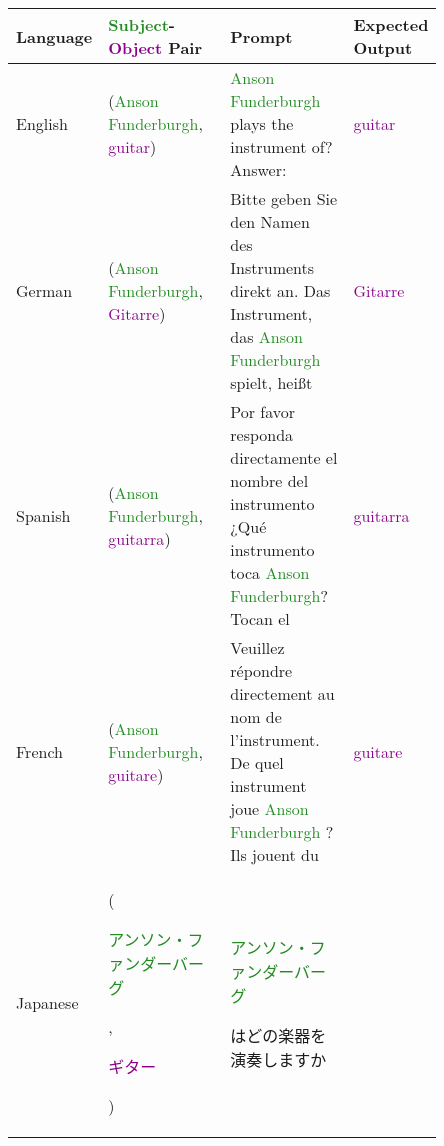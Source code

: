 \begin{table*}[htbp]
\scriptsize
\centering
\setlength{\tabcolsep}{1.0mm}{}
\begin{center}
\begin{tabular}{m{0.10\linewidth} p{0.30\linewidth} p{0.30\linewidth} m{0.15\linewidth}}
\textbf{Language} & \textbf{\textcolor{forestgreen}{Subject}-\textcolor{darkmagenta}{Object} Pair} & \textbf{Prompt} & \textbf{Expected Output} \\
\toprule
{\centering English} 
    & {\raggedright (\textcolor{forestgreen}{Anson Funderburgh}, \textcolor{darkmagenta}{guitar})}
    & \textcolor{forestgreen}{Anson Funderburgh} plays the instrument of? \newline Answer:
    & {\centering \textcolor{darkmagenta}{guitar}} \\
\midrule
{\centering German} 
    & {\raggedright (\textcolor{forestgreen}{Anson Funderburgh}, \textcolor{darkmagenta}{Gitarre})}
    & Bitte geben Sie den Namen des Instruments direkt an. Das Instrument, das \textcolor{forestgreen}{Anson Funderburgh} spielt, heißt
    & {\centering \textcolor{darkmagenta}{Gitarre}} \\
\midrule
{\centering Spanish} 
    & {\raggedright (\textcolor{forestgreen}{Anson Funderburgh}, \textcolor{darkmagenta}{guitarra})}
    & Por favor responda directamente el nombre del instrumento ¿Qué instrumento toca \textcolor{forestgreen}{Anson Funderburgh}? Tocan el
    & {\centering \textcolor{darkmagenta}{guitarra}} \\
\midrule
{\centering French} 
    & {\raggedright (\textcolor{forestgreen}{Anson Funderburgh}, \textcolor{darkmagenta}{guitare})}
    & Veuillez répondre directement au nom de l'instrument. De quel instrument joue \textcolor{forestgreen}{Anson Funderburgh} ? Ils jouent du
    & {\centering \textcolor{darkmagenta}{guitare}} \\
\midrule
{\centering Japanese} 
    & {\raggedright (\textcolor{forestgreen}{\begin{CJK}{UTF8}{min}アンソン・ファンダーバーグ\end{CJK}}, \textcolor{darkmagenta}{\begin{CJK}{UTF8}{min}ギター\end{CJK}})}
    & \textcolor{forestgreen}{\begin{CJK}{UTF8}{min}アンソン・ファンダーバーグ\end{CJK}}\begin{CJK}{UTF8}{min}はどの楽器を演奏しますか\end{CJK}

\end{tabular}
\end{center}
\end{table*}
